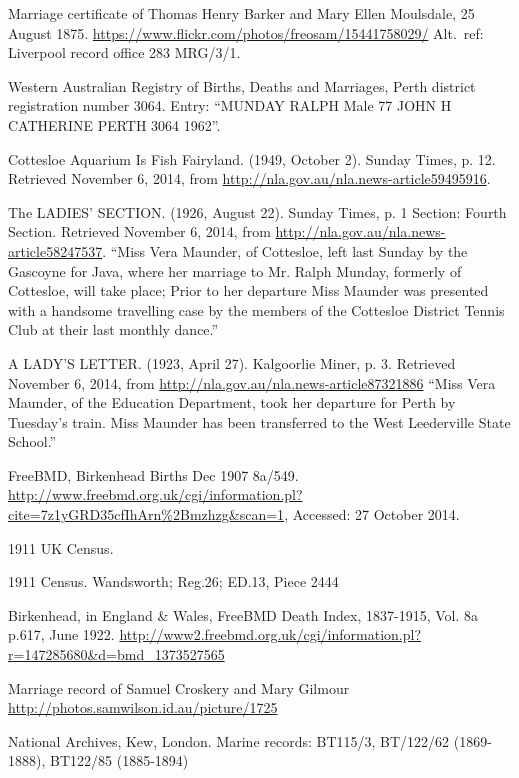\begin{thebibliography}{99}
	Marriage certificate of Thomas Henry Barker and Mary Ellen Moulsdale, 25 August 1875.
	\url{https://www.flickr.com/photos/freosam/15441758029/}
	Alt.~ref: Liverpool record office 283 MRG/3/1.

	 Western Australian Registry of Births, Deaths and Marriages, Perth district registration number 3064.
	 Entry: ``MUNDAY RALPH 	Male 	77 	JOHN H 	CATHERINE 		PERTH 	3064 	1962''.

	Cottesloe Aquarium Is Fish Fairyland.
	(1949, October 2). Sunday Times, p. 12. Retrieved November 6, 2014,
	from \url{http://nla.gov.au/nla.news-article59495916}.

	The LADIES' SECTION. (1926, August 22). Sunday Times, p. 1 Section: Fourth Section.
	Retrieved November 6, 2014, from \url{http://nla.gov.au/nla.news-article58247537}.
	``Miss Vera Maunder, of Cottesloe, left last Sunday by the Gascoyne for Java, where her marriage to Mr. Ralph Munday, formerly of Cottesloe, will take place; Prior to her departure Miss Maunder was presented with a handsome travelling case by the members of the Cottesloe District Tennis Club at their last monthly dance.''

	A LADY'S LETTER. (1923, April 27). Kalgoorlie Miner, p. 3.
	Retrieved November 6, 2014, from \url{http://nla.gov.au/nla.news-article87321886}
	``Miss Vera Maunder, of the Education Department, took her departure for Perth by Tuesday's train.
	Miss Maunder has been transferred to the West Leederville State School.''

	FreeBMD, Birkenhead Births Dec 1907 8a/549.
	\url{http://www.freebmd.org.uk/cgi/information.pl?cite=7z1yGRD35cfIhArn\%2Bmzhzg&scan=1}, Accessed: 27 October 2014.

	1911 UK Census.

	1911 Census. Wandsworth; Reg.26; ED.13, Piece 2444

	Birkenhead, in England \& Wales, FreeBMD Death Index, 1837-1915, Vol. 8a p.617, June 1922.
	\url{http://www2.freebmd.org.uk/cgi/information.pl?r=147285680&d=bmd_1373527565}

	Marriage record of Samuel Croskery and Mary Gilmour
	\url{http://photos.samwilson.id.au/picture/1725}

	National Archives, Kew, London.
	Marine records: BT115/3, BT/122/62 (1869-1888), BT122/85 (1885-1894)


\end{thebibliography}

